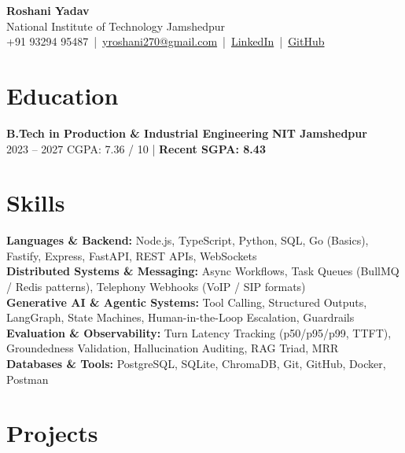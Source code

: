\documentclass[a4paper,10pt]{article}
\begin{document}
\begin{center}
    {\LARGE \textbf{\color{primary}Roshani Yadav}} \\[1.5pt]
    \small
    National Institute of Technology Jamshedpur \\[1pt]
    +91 93294 95487 \,|\,
    \href{mailto:yroshani270@gmail.com}{yroshani270@gmail.com} \,|\,
    \href{https://www.linkedin.com/in/roshani-yadav-20271a28a}{LinkedIn} \,|\,
    \href{https://github.com/roshani-005}{GitHub}
\end{center}

\vspace{-4pt}

\section*{Education}
\textbf{B.Tech in Production \& Industrial Engineering} \hfill \textbf{NIT Jamshedpur} \\
2023 -- 2027 \hfill CGPA: 7.36 / 10 \quad | \quad \textbf{Recent SGPA: 8.43} \\[-1pt]

\section*{Skills}
\textbf{Languages \& Backend:} Node.js, TypeScript, Python, SQL, Go (Basics), Fastify, Express, FastAPI, REST APIs, WebSockets \\
\textbf{Distributed Systems \& Messaging:} Async Workflows, Task Queues (BullMQ / Redis patterns), Telephony Webhooks (VoIP / SIP formats) \\
\textbf{Generative AI \& Agentic Systems:} Tool Calling, Structured Outputs, LangGraph, State Machines, Human-in-the-Loop Escalation, Guardrails \\
\textbf{Evaluation \& Observability:} Turn Latency Tracking (p50/p95/p99, TTFT), Groundedness Validation, Hallucination Auditing, RAG Triad, MRR \\
\textbf{Databases \& Tools:} PostgreSQL, SQLite, ChromaDB, Git, GitHub, Docker, Postman

\section*{Projects}
\end{document}

